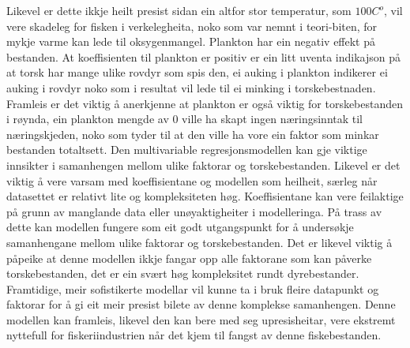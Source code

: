 \documentclass{report}
\begin{document}
Likevel er dette ikkje heilt presist sidan ein altfor stor temperatur, som $100C^o$, vil vere skadeleg for fisken i verkelegheita, noko som var nemnt i teori-biten, for mykje varme kan lede til oksygenmangel.
Plankton har ein negativ effekt på bestanden. At koeffisienten til plankton er positiv er ein litt uventa indikajson på at torsk har mange ulike rovdyr som spis den, ei auking i plankton indikerer ei auking i rovdyr noko som i resultat vil lede til ei minking i torskebestnaden.
Framleis er det viktig å anerkjenne at plankton er også viktig for torskebestanden i røynda, ein plankton mengde av $0$ ville ha skapt ingen næringsinntak til næringskjeden, noko som tyder til at den ville ha vore ein faktor som minkar bestanden totaltsett.  
Den multivariable regresjonsmodellen kan gje viktige innsikter i samanhengen mellom ulike faktorar og torskebestanden.
Likevel er det viktig å vere varsam med koeffisientane og modellen som heilheit, særleg når datasettet er relativt lite og kompleksiteten høg.
Koeffisientane kan vere feilaktige på grunn av manglande data eller unøyaktigheiter i modelleringa.
På trass av dette kan modellen fungere som eit godt utgangspunkt for å undersøkje samanhengane mellom ulike faktorar og torskebestanden.
Det er likevel viktig å påpeike at denne modellen ikkje fangar opp alle faktorane som kan påverke torskebestanden, det er ein svært høg kompleksitet rundt dyrebestander.
Framtidige, meir sofistikerte modellar vil kunne ta i bruk fleire datapunkt og faktorar for å gi eit meir presist bilete av denne komplekse samanhengen.
Denne modellen kan framleis, likevel den kan bere med seg upresisheitar, vere ekstremt nyttefull for fiskeriindustrien når det kjem til fangst av denne fiskebestanden. 
\end{document}
